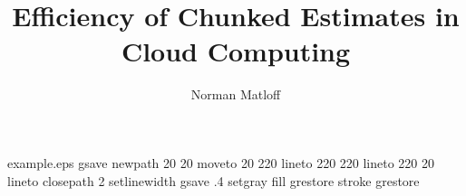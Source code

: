 %
%
%
%
%
\begin{filecontents*}{example.eps}
gsave
newpath
  20 20 moveto
  20 220 lineto
  220 220 lineto
  220 20 lineto
closepath
2 setlinewidth
gsave
  .4 setgray fill
grestore
stroke
grestore
\end{filecontents*}
%
\documentclass[twocolumn]{svjour3}         %

\smartqed  %

\usepackage{graphicx}

\usepackage{mathptmx}      %

%




\title{Efficiency of Chunked Estimates in Cloud Computing}


\author{Norman Matloff}



